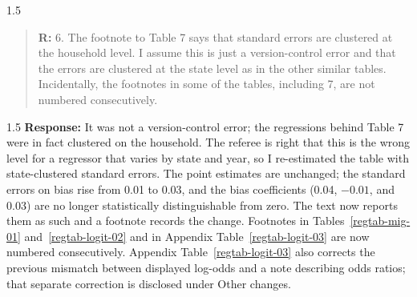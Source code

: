 \documentclass[12pt,english]{article}
\newcommand{\rrxspc}{1.5}
\begin{document}
\begin{refsection}
    \begin{spacing}{\rrxspc}
            \begin{quotation}
                \textbf{R: } 6. The footnote to Table 7 says that standard errors are clustered at the household level. I assume this is just a version-control error and that the errors are clustered at the state level as in the other similar tables. Incidentally, the footnotes in some of the tables, including 7, are not numbered consecutively.
            \end{quotation}
    \end{spacing}
    \begin{spacing}{\rrxspc}
        \textbf{Response:} It was not a version-control error; the regressions behind Table 7 were in fact clustered on the household. The referee is right that this is the wrong level for a regressor that varies by state and year, so I re-estimated the table with state-clustered standard errors. The point estimates are unchanged; the standard errors on bias rise from 0.01 to 0.03, and the bias coefficients (0.04, $-0.01$, and 0.03) are no longer statistically distinguishable from zero. The text now reports them as such and a footnote records the change. Footnotes in Tables~\ref{regtab-mig-01} and~\ref{regtab-logit-02} and in Appendix Table~\ref{regtab-logit-03} are now numbered consecutively. Appendix Table~\ref{regtab-logit-03} also corrects the previous mismatch between displayed log-odds and a note describing odds ratios; that separate correction is disclosed under Other changes.
    \end{spacing}


\end{refsection}
\end{document}
